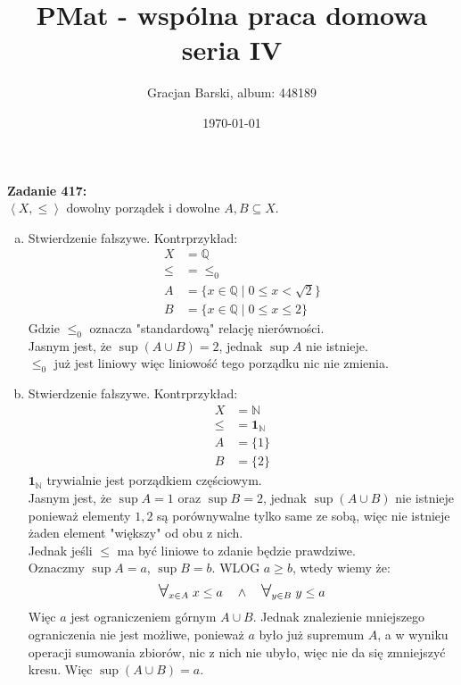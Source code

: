 \documentclass[10pt]{article}
\title{PMat - wspólna praca domowa seria IV}
\author{Gracjan Barski, album: 448189}
\date{\today}
\newcommand{\N}{\mathbb{N}}
\newcommand{\Q}{\mathbb{Q}}
\newcommand{\Forall}{{\Large\mbox{$\forall$}}}
\begin{document}
\maketitle
\textbf{Zadanie 417:} \\[10pt]
$\left\langle X, \leq \right\rangle$ dowolny porządek i dowolne $A, B \subseteq X$.
\begin{enumerate}[(a)]
    \item Stwierdzenie fałszywe. Kontrprzykład:
    \begin{align*}
        X &= \Q \\ 
        \leq &= \leq_0 \\
        A &= \{x \in \Q \mid 0 \leq x < \sqrt{2} \} \\
        B &= \{x \in \Q \mid 0 \leq x \leq 2 \}
    \end{align*}
    Gdzie $\leq_0$ oznacza "standardową" relację nierówności. \\
    Jasnym jest, że $\sup(A \cup B) = 2$, jednak $\sup A$ nie istnieje. \\[5pt]
    $\leq_0$ już jest liniowy więc liniowość tego porządku nic nie zmienia.
    
    \item Stwierdzenie fałszywe. Kontrprzykład:
    \begin{align*}
        X &= \N \\ 
        \leq &= \mathbf{1}_\N \\
        A &= \{1\} \\
        B &= \{2\}
    \end{align*}
    $\mathbf{1}_\N$ trywialnie jest porządkiem częściowym. \\
    Jasnym jest, że $\sup A = 1$ oraz $\sup B = 2$, jednak $\sup(A \cup B)$ nie istnieje ponieważ elementy $1, 2$ są porównywalne tylko same ze sobą, więc nie istnieje żaden element "większy" od obu z nich. \\[10pt]
    Jednak jeśli $\leq$ ma być liniowe to zdanie będzie prawdziwe. \\
    Oznaczmy $\sup A = a$, $\sup B = b$. WLOG $a \geq b$, wtedy wiemy że:
    $$\Forall_{x \in A} \; x \leq a \hspace{10pt} \land \hspace{10pt} \Forall_{y \in B} \; y \leq a$$
    Więc $a$ jest ograniczeniem górnym $A \cup B$. Jednak znalezienie mniejszego ograniczenia nie jest możliwe, ponieważ $a$ było już supremum $A$, a w wyniku operacji sumowania zbiorów, nic z nich nie ubyło, więc nie da się zmniejszyć kresu. Więc $\sup (A \cup B) = a$.


\end{enumerate}
\end{document}
